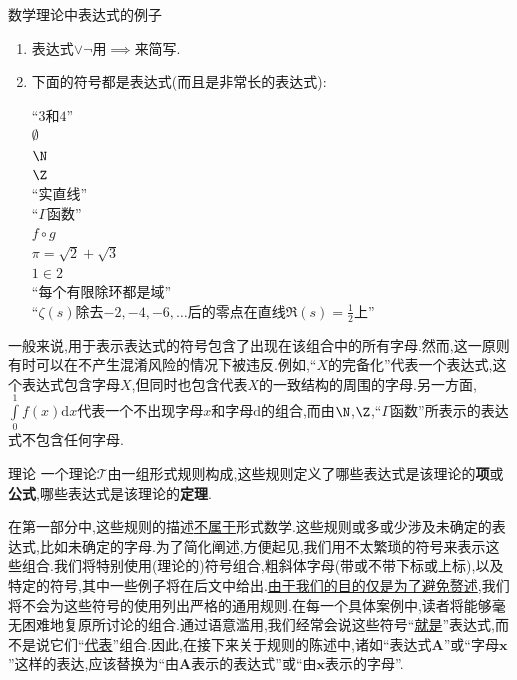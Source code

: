 \begin{example}{数学理论中表达式的例子}{}
	\begin{enumerate}
		\item 表达式$\vee\neg$用$\implies$来简写.
		\item 下面的符号都是表达式(而且是非常长的表达式):
		\begin{center}
			``$3$和$4$''\\
			$\emptyset$\\
			$\N$\\
			$\Z$\\
			``实直线''\\
			``$\Gamma$函数''\\
			$f\circ g$\\
			$\pi=\sqrt{2}+\sqrt{3}$\\
			$1\in 2$\\
			``每个有限除环都是域''\\
			``$\zeta\left(s\right)$除去$-2,-4,-6,\ldots$后的零点在直线$\Re\left(s\right)=\frac{1}{2}$上''
		\end{center}
	\end{enumerate}
\end{example}

\begin{remark}{}{}
	一般来说,用于表示表达式的符号包含了出现在该组合中的所有字母.然而,这一原则有时可以在不产生混淆风险的情况下被违反.例如,``$X$的完备化''代表一个表达式,这个表达式包含字母$X$,但同时也包含代表$X$的一致结构的周围的字母.另一方面,$\int\limits_{0}^{1}f\left(x\right)\mathrm{d}x$代表一个不出现字母$x$和字母$\mathrm{d}$的组合,而由$\N$,$\Z$,``$\Gamma$函数''所表示的表达式不包含任何字母.
\end{remark}

\begin{definition}{理论}{}
	一个理论$\mathcal{T}$由一组形式规则构成,这些规则定义了哪些表达式是该理论的\textbf{项}或\textbf{公式},哪些表达式是该理论的\textbf{定理}.
\end{definition}

\begin{remark}{}{}
	在第一部分中,这些规则的描述\underline{不属于}形式数学.这些规则或多或少涉及未确定的表达式,比如未确定的字母.为了简化阐述,方便起见,我们用不太繁琐的符号来表示这些组合.我们将特别使用(理论的)符号组合,粗斜体字母(带或不带下标或上标),以及特定的符号,其中一些例子将在后文中给出.\underline{由于我们的目的仅是为了避免赘述},我们将不会为这些符号的使用列出严格的通用规则.在每一个具体案例中,读者将能够毫无困难地复原所讨论的组合.通过语意滥用,我们经常会说这些符号``\underline{就是}''表达式,而不是说它们``\underline{代表}''组合.因此,在接下来关于规则的陈述中,诸如``表达式$\boldsymbol{A}$''或``字母$\boldsymbol{x}$''这样的表达,应该替换为``由$\boldsymbol{A}$表示的表达式''或``由$\boldsymbol{x}$表示的字母''.
\end{remark}

